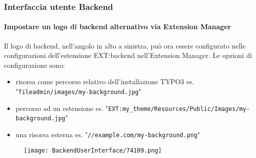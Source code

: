 \begin{frame}[fragile]
	\frametitle{Interfaccia utente Backend}
	\framesubtitle{Impostare un logo di backend alternativo via Extension Manager}

	Il logo di backend, nell'angolo in alto a sinistra, può ora essere configurato nelle configurazioni
	dell'estensione EXT:backend nell'Extension Manager.\newline
	Le opzioni di configurazione sono:

	\begin{itemize}
		\item risorsa come percorso relativo dell'installazione TYPO3\newline
			\smaller
				es. "\texttt{fileadmin/images/my-background.jpg}"
			\normalsize

		\item percorso ad un estensione\newline
			\smaller
				es. "\texttt{EXT:my\_theme/Resources/Public/Images/my-background.jpg}"
			\normalsize

		\item una risorsa esterna\newline
			\smaller
				es. "\texttt{//example.com/my-background.png}"
			\normalsize

	\end{itemize}

	\begin{figure}
		\texttt{[image: BackendUserInterface/74109.png]}
	\end{figure}

\end{frame}

